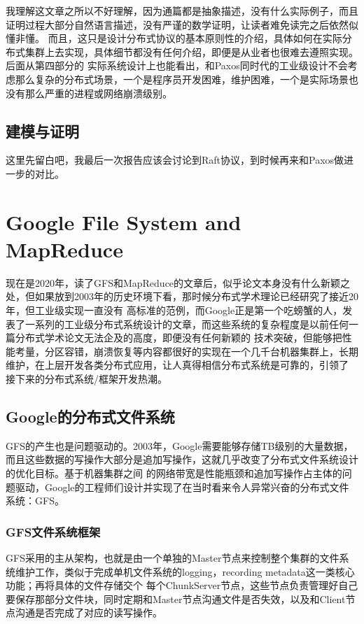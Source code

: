 \documentclass[UTF8]{article}
\begin{document}
我理解这文章之所以不好理解，因为通篇都是抽象描述，没有什么实际例子，而且证明过程大部分自然语言描述，没有严谨的数学证明，让读者难免读完之后依然似懂非懂。
而且，这只是设计分布式协议的基本原则性的介绍，具体如何在实际分布式集群上去实现，具体细节都没有任何介绍，即便是从业者也很难去遵照实现。后面从第四部分的
实际系统设计上也能看出，和Paxos同时代的工业级设计不会考虑那么复杂的分布式场景，一个是程序员开发困难，维护困难，一个是实际场景也没有那么严重的进程或网络崩溃级别。

\subsection{建模与证明}
这里先留白吧，我最后一次报告应该会讨论到Raft协议，到时候再来和Paxos做进一步的对比。

    
\section{Google File System and MapReduce}
现在是2020年，读了GFS和MapReduce的文章后，似乎论文本身没有什么新颖之处，但如果放到2003年的历史环境下看，那时候分布式学术理论已经研究了接近20年，但工业级实现一直没有
高标准的范例，而Google正是第一个吃螃蟹的人，发表了一系列的工业级分布式系统设计的文章，而这些系统的复杂程度是以前任何一篇分布式学术论文无法企及的高度，即便没有任何新颖的
技术突破，但能够把性能考量，分区容错，崩溃恢复等内容都很好的实现在一个几千台机器集群上，长期维护，在上层开发各类分布式应用，让人真得相信分布式系统是可靠的，引领了
接下来的分布式系统/框架开发热潮。

\subsection{Google的分布式文件系统}
GFS的产生也是问题驱动的。2003年，Google需要能够存储TB级别的大量数据，而且这些数据的写操作大部分是追加写操作，这就几乎改变了分布式文件系统设计的优化目标。基于机器集群之间
的网络带宽是性能瓶颈和追加写操作占主体的问题驱动，Google的工程师们设计并实现了在当时看来令人异常兴奋的分布式文件系统：GFS。

\subsubsection{GFS文件系统框架}
GFS采用的主从架构，也就是由一个单独的Master节点来控制整个集群的文件系统维护工作，类似于完成单机文件系统的logging，recording metadata这一类核心功能；再将具体的文件存储交个
每个ChunkServer节点，这些节点负责管理好自己要保存那部分文件块，同时定期和Master节点沟通文件是否失效，以及和Client节点沟通是否完成了对应的读写操作。
\end{document}
